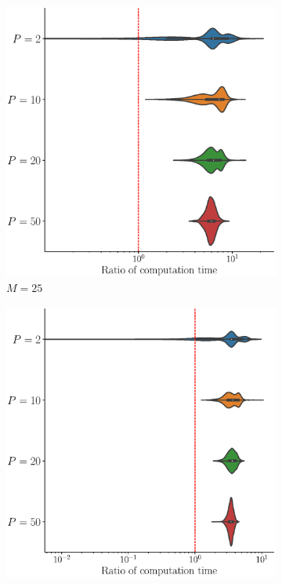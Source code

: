\begin{results}

\begin{figure}
     \centering
     \begin{subfigure}[b]{0.49\textwidth}
         \centering
         \includegraphics[width=\textwidth]{figures/scenario_1/computation_time_N50_M25.eps}
         \caption{$M = 25$}
         \label{fig:computation_time_mfd_1d_25}
     \end{subfigure}
     \hfill
     \begin{subfigure}[b]{0.49\textwidth}
         \centering
         \includegraphics[width=\textwidth]{figures/scenario_1/computation_time_N50_M50.eps}

\end{subfigure}
\end{figure}
\end{results}
